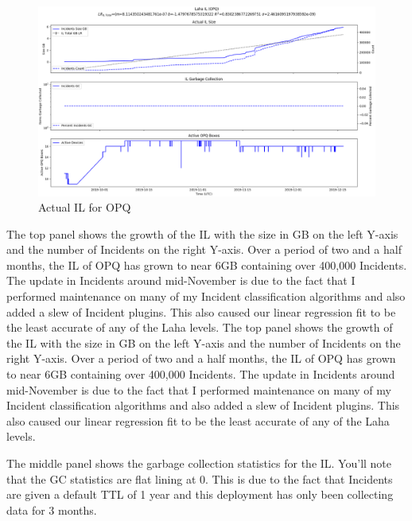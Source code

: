 \begin{figure}[H]
    \centering
    \includegraphics[width=\linewidth]{figures/actual_il_opq.png}
    \caption{Actual IL for OPQ}
    \label{fig:actual_il_opq}
\end{figure}

The top panel shows the growth of the IL with the size in GB on the left Y-axis and the number of Incidents on the right Y-axis. Over a period of two and a half months, the IL of OPQ has grown to near 6GB containing over 400,000 Incidents. The update in Incidents around mid-November is due to the fact that I performed maintenance on many of my Incident classification algorithms and also added a slew of Incident plugins. This also caused our linear regression fit to be the least accurate of any of the Laha levels.
The top panel shows the growth of the IL with the size in GB on the left Y-axis and the number of Incidents on the right Y-axis. Over a period of two and a half months, the IL of OPQ has grown to near 6GB containing over 400,000 Incidents. The update in Incidents around mid-November is due to the fact that I performed maintenance on many of my Incident classification algorithms and also added a slew of Incident plugins. This also caused our linear regression fit to be the least accurate of any of the Laha levels.

The middle panel shows the garbage collection statistics for the IL. You'll note that the GC statistics are flat lining at 0. This is due to the fact that Incidents are given a default TTL of 1 year and this deployment has only been collecting data for 3 months.

